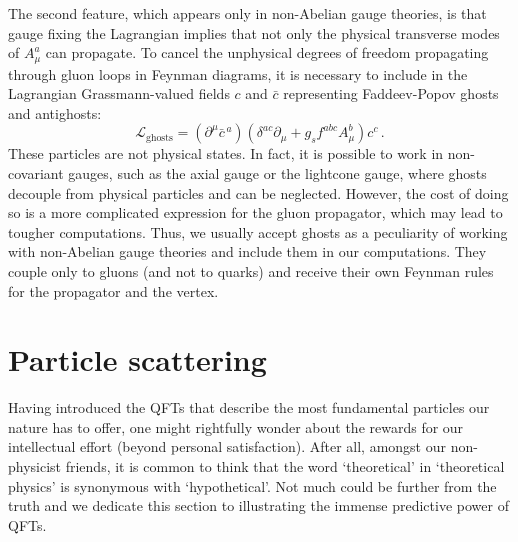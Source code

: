 \documentclass[main.tex]{subfiles}
\begin{document}
The second feature, which appears only in non-Abelian gauge theories, is that gauge fixing the Lagrangian implies that not only the physical transverse modes of $A^a_\mu$ can propagate. To cancel the unphysical degrees of freedom propagating through gluon loops in Feynman diagrams, it is necessary to include in the Lagrangian Grassmann-valued fields $c$ and $\bar{c}$ representing Faddeev-Popov ghosts and antighosts:
\begin{equation} \label{eq:ghosts}
    \mathcal{L}_\text{ghosts} = (\partial^\mu \bar{c}^{\,a})(\delta^{ac} \partial_\mu + g_s f^{abc} A^b_\mu ) c^c\,.
\end{equation}
These particles are not physical states. In fact, it is possible to work in non-covariant gauges, such as the axial gauge or the lightcone gauge, where ghosts decouple from physical particles and can be neglected. However, the cost of doing so is a more complicated expression for the gluon propagator, which may lead to tougher computations. Thus, we usually accept ghosts as a peculiarity of working with non-Abelian gauge theories and include them in our computations. They couple only to gluons (and not to quarks) and receive their own Feynman rules for the propagator and the vertex.

\section{Particle scattering} \label{sec:particlescattering}
Having introduced the QFTs that describe the most fundamental particles our nature has to offer, one might rightfully wonder about the rewards for our intellectual effort (beyond personal satisfaction). After all, amongst our non-physicist friends, it is common to think that the word `theoretical' in `theoretical physics' is synonymous with `hypothetical'. Not much could be further from the truth and we dedicate this section to illustrating the immense predictive power of QFTs.
\end{document}
